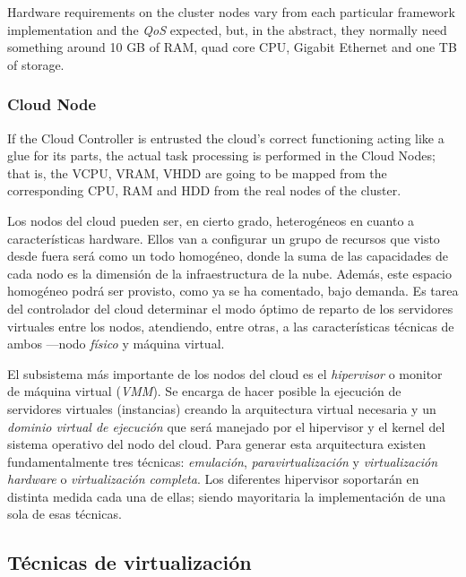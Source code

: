 Hardware requirements on the cluster nodes vary from each particular framework implementation and the \emph{QoS} expected, but, in the abstract, they normally need something around 10 GB of RAM, quad core CPU, Gigabit Ethernet and one TB of storage.


\subsubsection{Cloud Node}\label{subsubsec:cloudnode}

\noindent If the Cloud Controller is entrusted the cloud's correct functioning acting like a glue for its parts, the actual task processing is performed in the Cloud Nodes; that is, the VCPU, VRAM, VHDD are going to be mapped from the corresponding CPU, RAM and HDD from the real nodes of the cluster.

Los nodos del cloud pueden ser, en cierto grado, heterog\'eneos en cuanto a caracter\'isticas hardware. Ellos van a configurar un grupo de recursos que visto desde fuera ser\'a como un todo homog\'eneo, donde la suma de las capacidades de cada nodo es la dimensi\'on de la infraestructura de la nube. Adem\'as, este espacio homog\'eneo podr\'a ser provisto, como ya se ha comentado, bajo demanda. Es tarea del controlador del cloud determinar el modo \'optimo de reparto de los servidores virtuales entre los nodos, atendiendo, entre otras, a las caracter\'isticas t\'ecnicas de ambos ---nodo \emph{f\'isico} y m\'aquina virtual.\newline

El subsistema m\'as importante de los nodos del cloud es el \emph{hipervisor} o monitor de m\'aquina virtual (\emph{VMM}). Se encarga de hacer posible la ejecuci\'on de servidores virtuales (instancias) creando la arquitectura virtual necesaria y un \emph{dominio virtual de ejecuci\'on} que ser\'a manejado por el hipervisor y el kernel del sistema operativo del nodo del cloud. Para generar esta arquitectura existen fundamentalmente tres t\'ecnicas: \emph{emulaci\'on}, \emph{paravirtualizaci\'on} y \emph{virtualizaci\'on hardware} o \emph{virtualizaci\'on completa}. Los diferentes hipervisor soportar\'an en distinta medida cada una de ellas; siendo mayoritaria la implementaci\'on de una sola de esas t\'ecnicas.\newline

\subsection{T\'ecnicas de virtualizaci\'on}\label{subsec:tecnicasemu}

